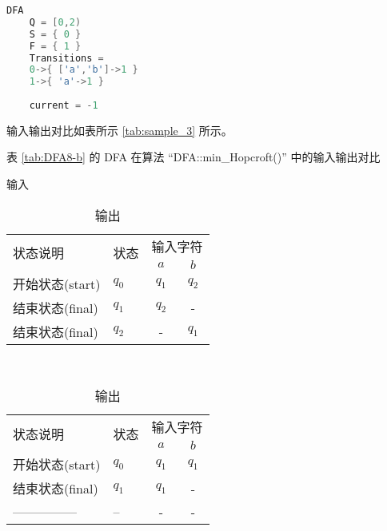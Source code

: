 \begin{lstlisting}[language=C++,label={lst:hoperrorResult},caption={}]
    DFA
    Q = [0,2)
    S = { 0 }
    F = { 1 }
    Transitions =
    0->{ ['a','b']->1 }
    1->{ 'a'->1 }
    
    current = -1
\end{lstlisting}

输入输出对比如表所示 \ref{tab:sample_3} 所示。

\begin{table}[!htbp]
    \caption{表 \ref{tab:DFA8-b} 的 DFA 在算法 “DFA::min\_Hopcroft()” 中的输入输出对比 }
    \label{tab:sample_3}
    \centering
    \small%
    \setlength{\tabcolsep}{4pt}%
    \renewcommand{\arraystretch}{1.2}%
    \begin{subtable}[t]{0.45\textwidth}
        \centering
        \caption{输入}
        \label{tab:sample_3_origin}
        \begin{tabular}{l p{2em}<{\centering} c c}
            \toprule%
            \multirow{2}{*}{状态说明} & \multirow{2}{*}{状态} & \multicolumn{2}{c}{输入字符} \\
            \cline{3-4}      &    &$a$ & $b$  \\
            \midrule%
            开始状态(start)  & $q_0$ & $q_1$   & $q_2$   \\
            结束状态(final) & $q_1$ & $q_2$   &     -   \\
            结束状态(final) & $q_2$ & -       & $q_1$   \\
            \bottomrule%
        \end{tabular}
    \end{subtable}
    ~%
    \begin{subtable}[t]{0.45\textwidth}
        \centering
        \caption{输出}
        \label{tab:sample_3_result}
        \begin{tabular}{l p{2em}<{\centering} c c }
            \toprule%
            \multirow{2}{*}{状态说明} & \multirow{2}{*}{状态} & \multicolumn{2}{c}{输入字符} \\
            \cline{3-4}      &    & $a$ & $b$  \\
            \midrule%
            开始状态(start)  & $q_0$ & $q_1$   & $q_1$   \\
            结束状态(final) & $q_1$ & $q_1$   & -   \\
            ---------------& --& - & - \\
            \bottomrule%
        \end{tabular}
    \end{subtable}
\end{table}

